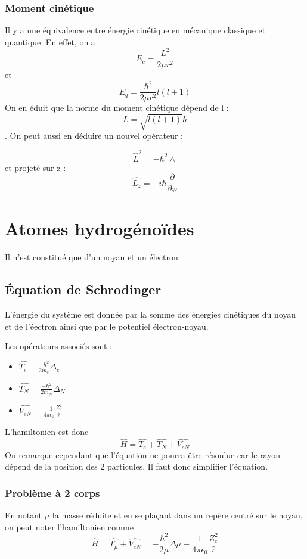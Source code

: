 \documentclass[french]{yLectureNote}
\newcommand{\HH}{\hat{H}}
\newcommand{\hb}{\hbar}
\begin{document}
\subsubsection{Moment cinétique}
Il y a une équivalence entre énergie cinétique en mécanique classique et quantique. En effet, on a
 \[E_c = \frac{L^2}{2\mu r^2}\]
 et \[E_q = \frac{\hb^2}{2\mu r^2}l(l+1)\]
On en éduit que la norme du moment cinétique dépend de l : \[L = \sqrt{l(l+1)}\hb\]. On peut aussi en déduire un nouvel opérateur :
\begin{definition}
\[\hat{L}^2 = -\hb^2\wedge\] et projeté sur z : \[\hat{L_z} = -i\hb \frac{\partial}{\partial \varphi}\]
\end{definition}
\section{Atomes hydrogénoïdes}
\begin{definition}
Il n'est constitué que d'un noyau et un électron
\end{definition}
\subsection{Équation de Schrodinger}
L'énergie du système est donnée par la somme des énergies cinétiques du noyau et de l'éectron ainsi que par le potentiel électron-noyau.

Les opérateurs associés sont :
\begin{itemize}
 \item \(\hat{T_e} = \frac{-\hb^2}{2m_e}\Delta_e\)
 \item \(\hat{T_N} = \frac{-\hb^2}{2m_N}\Delta_N\)
\item \(\hat{V_{eN}} = \frac{-1}{4\pi\epsilon_0}\frac{Z_e^2}{\hat{r}}\)
\end{itemize}
L'hamiltonien est donc \[\HH = \hat{T_e} + \hat{T_N}+\hat{V_{eN}}\] On remarque cependant que l'équation ne pourra \^etre résoulue car le rayon dépend de la position des 2 particules. Il faut donc simplifier l'équation.
\subsubsection{Problème à 2 corps}
En notant \(\mu\) la masse réduite et en se plaçant dans un repère centré sur le noyau, on peut noter l'hamiltonien comme \[\HH = \hat{T_{\mu}} + \hat{V_{eN}} = -\frac{\hb^2}{2\mu}\Delta \mu - \frac{1}{4\pi \epsilon_0}\frac{Z_e^2}{\hat{r}}\]
\end{document}
